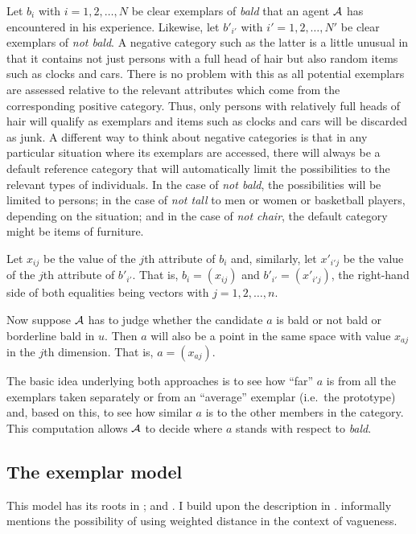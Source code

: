Let $b_i$ with $i = 1, 2, \ldots, N$ be clear exemplars of \emph{bald} that an agent $\cal A$ has encountered in his experience. Likewise, let $b'_{i'}$ with $i' = 1, 2, \ldots, N'$ be clear exemplars of \emph{not bald}. A negative category such as the latter is a little unusual in that it contains not just persons with a full head of hair but also random items such as clocks and cars. There is no problem with this as all potential exemplars are assessed relative to the relevant attributes which come from the corresponding positive category. Thus, only persons with relatively full heads of hair will qualify as exemplars and items such as clocks and cars will be discarded as junk. A different way to think about negative categories is that in any particular situation where its exemplars are accessed, there will always be a default reference category that will automatically limit the possibilities to the relevant types of individuals. In the case of \emph{not bald}, the possibilities will be limited to persons; in the case of \emph{not tall} to men or women or basketball players, depending on the situation; and in the case of \emph{not chair}, the default category might be items of furniture.

Let $x_{ij}$ be the value of the $j$th attribute of $b_i$ and, similarly, let $x'_{i'j}$ be the value of the $j$th attribute of $b'_{i'}$. That is, $b_i = (x_{ij})$ and $b'_{i'} = (x'_{i'j})$, the right-hand side of both equalities being vectors with $j = 1, 2, \ldots, n$.

Now suppose $\cal A$ has to judge whether the candidate $a$ is bald or not bald or borderline bald in $u$. Then $a$ will also be a point in the same space with value $x_{aj}$ in the $j$th dimension. That is, $a = (x_{aj})$.

The basic idea underlying both approaches is to see how ``far'' $a$ is from all the exemplars taken separately or from an ``average'' exemplar (i.e.\ the prototype) and, based on this, to see how similar $a$ is to the other members in the category. This computation allows $\cal A$ to decide where $a$ stands with respect to \emph{bald}.


\subsection{The exemplar model}

This model has its roots in \citet{ms:ctcl,nosofsky:epsr}; and \citet{np:e}. I build upon the description in \citet[65--71]{murphy:bbc}. \citet{schiffer:vp} informally mentions the possibility of using weighted distance in the context of vagueness.


